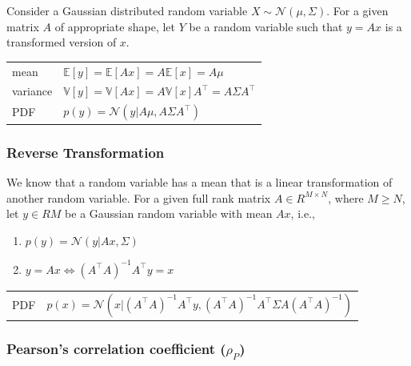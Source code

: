 Consider a Gaussian distributed random variable $X \sim \mathcal{N}(\mu , \Sigma )$. For a given matrix $A$ of appropriate shape, let $Y$ be a random variable such that $y = Ax$ is a transformed version of $x$.

\begin{table}[H]
    \begin{tabular}{l l}
        mean & $\mathbb{E}[y] = \mathbb{E}[Ax] = A\mathbb{E}[x] = A\mu $ \\

        variance & $\mathbb{V}[y] = \mathbb{V}[Ax] = A\mathbb{V}[x]A^\top  = A\Sigma A^\top $ \\

        PDF & $p(y) = \mathcal{N}(y|A\mu , A\Sigma A^\top )$ \\

    \end{tabular}
\end{table}


\subsubsection{Reverse Transformation}

We know that a random variable has a mean that is a linear transformation of another random variable. For a given full rank matrix $A \in R^{M\times N}$, where $M \geq N$, let $y \in RM$ be a Gaussian random variable with mean $Ax$, i.e., 

\begin{enumerate}[itemsep=0.3cm]
    \item $p(y) = \mathcal{N}(y|Ax, \Sigma )$

    \item $y = Ax \Leftrightarrow (A^\top A)^{-1} A^\top y = x$
\end{enumerate}

\begin{customTableWrapper}{1}
\begin{table}[H]
    \begin{tabular}{l l}
        PDF & $p(x) = \mathcal{N}(x|(A^\top A)^{-1} A^\top y, (A^\top A)^{-1} A^\top \Sigma A(A^\top A)^{-1} )$\\

        
    \end{tabular}
\end{table}
\end{customTableWrapper}


\subsubsection{Pearson’s correlation coefficient ($\rho_P$) \cite{ism-1}} \label{Normal distribution: Bivariate/ Multivariate: Pearson’s correlation coefficient}

